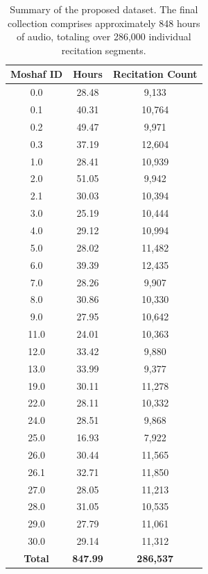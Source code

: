 \begin{longtable}{|c|c|c|}
\caption{Summary of the proposed dataset. The final collection comprises approximately 848 hours of audio, totaling over 286,000 individual recitation segments.}
\label{tab:all_data_stat}\\
\hline
\textbf{Moshaf ID} & \textbf{Hours} & \textbf{Recitation Count} \\ 
\hline
\endfirsthead
\hline
0.0 & 28.48 & 9,133 \\
\hline
0.1 & 40.31 & 10,764 \\
\hline
0.2 & 49.47 & 9,971 \\
\hline
0.3 & 37.19 & 12,604 \\
\hline
1.0 & 28.41 & 10,939 \\
\hline
2.0 & 51.05 & 9,942 \\
\hline
2.1 & 30.03 & 10,394 \\
\hline
3.0 & 25.19 & 10,444 \\
\hline
4.0 & 29.12 & 10,994 \\
\hline
5.0 & 28.02 & 11,482 \\
\hline
6.0 & 39.39 & 12,435 \\
\hline
7.0 & 28.26 & 9,907 \\
\hline
8.0 & 30.86 & 10,330 \\
\hline
9.0 & 27.95 & 10,642 \\
\hline
11.0 & 24.01 & 10,363 \\
\hline
12.0 & 33.42 & 9,880 \\
\hline
13.0 & 33.99 & 9,377 \\
\hline
19.0 & 30.11 & 11,278 \\
\hline
22.0 & 28.11 & 10,332 \\
\hline
24.0 & 28.51 & 9,868 \\
\hline
25.0 & 16.93 & 7,922 \\
\hline
26.0 & 30.44 & 11,565 \\
\hline
26.1 & 32.71 & 11,850 \\
\hline
27.0 & 28.05 & 11,213 \\
\hline
28.0 & 31.05 & 10,535 \\
\hline
29.0 & 27.79 & 11,061 \\
\hline
30.0 & 29.14 & 11,312 \\
\hline
\textbf{Total} & \textbf{847.99} & \textbf{286,537} \\
\hline
\end{longtable}




